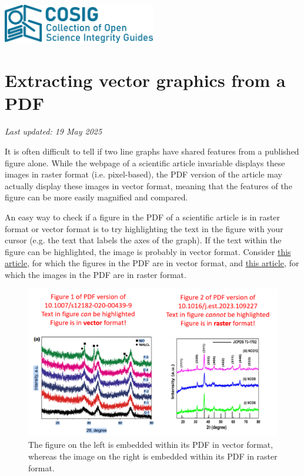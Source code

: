 \documentclass[letterpaper, 12pt]{article}
\begin{document}
\flushleft
\includegraphics[width=0.5\textwidth]{img/home/241017_final_logo_mockup.png}

\section*{Extracting vector graphics from a PDF}
\textit{Last updated: 19 May 2025}

It is often difficult to tell if two line graphs have shared features from a published figure alone. While the webpage of a scientific article invariable displays these images in raster format (i.e. pixel-based), the PDF version of the article may actually display these images in vector format, meaning that the features of the figure can be more easily magnified and compared.

An easy way to check if a figure in the PDF of a scientific article is in raster format or vector format is to try highlighting the text in the figure with your cursor (e.g. the text that labels the axes of the graph). If the text within the figure can be highlighted, the image is probably in vector format. Consider \href{https://doi.org/10.1007/s12182-020-00439-9}{this article}, for which the figures in the PDF are in vector format, and \href{https://doi.org/10.1016/j.est.2023.109227}{this article}, for which the images in the PDF are in raster format.

\begin{figure}[h!tbp]
    \includegraphics[width=\textwidth]{img/vector/vector_vs_raster.PNG}
    \caption*{ The figure on the left is embedded within its PDF in vector format, whereas the image on the right is embedded within its PDF in raster format.}
\end{figure}
\end{document}
